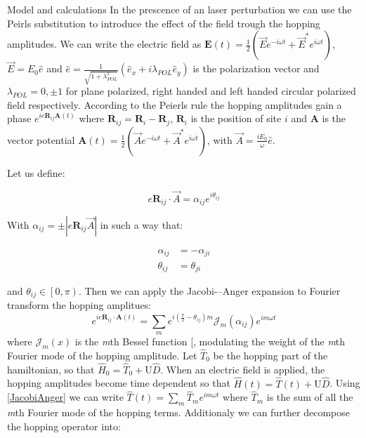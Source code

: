 \documentclass[aps,prl,twocolumn,amsmath,amssymb,superscriptaddress,nobibnotes]{revtex4}%
\renewcommand{\cite}[1]{{[}\onlinecite{#1}{]}}
\newcommand{\bs}{\boldsymbol}
\begin{document}
\begin{section}{Model and calculations}
In the prescence of an laser perturbation we can use the Peirls substitution to introduce the effect of the field trough the hopping amplitudes. We can write the electric field as $\bs{E}(t) = \frac{1}{2}(\vec{E}e^{-i\omega t}+\vec{E}^*e^{i\omega t})$, $\vec{E} = E_0\hat{e}$ and $\hat{e} = \frac{1}{\sqrt{1+\lambda_{POL}^2}}(\hat{e}_x+i\lambda_{POL}\hat{e}_y)$ is the polarization vector and $\lambda_{POL} = 0, \pm 1$ for plane polarized, right handed and left handed circular polarized field respectively. According to the Peierls rule the hopping amplitudes gain a phase $e^{ie\bs{R}_{ij}\bs{A}(t)}$ where $\bs{R}_{ij} = \bs{R}_i-\bs{R}_j$, $\bs{R}_i$ is the position of site $i$ and $\bs{A}$ is the vector potential $\bs{A}(t) = \frac{1}{2}(\vec{A}e^{-i\omega t} + \vec{A}^* e^{i\omega t})$, with $\vec{A} = \frac{iE_0}{\omega}\hat{e}$.

Let us define:

\begin{equation}
\label{Def_alpha}
e\bs{R}_{ij}\cdot\vec{A} = \alpha_{ij} e^{i \theta_{ij}}
\end{equation}

With $\alpha_{ij} = \pm|e\bs{R}_{ij}\vec{A}|$ in such a way that:

\begin{align}
\alpha_{ij} &= -\alpha_{ji} \label{alphaSym} \\
\theta_{ij} &= \theta_{ji} \label{thetaSym}
\end{align}

and $\theta_{ij} \in \left[0,\pi\right)$. Then we can apply the Jacobi-–Anger expansion to Fourier transform the hopping amplitues:
\begin{equation}
\label{JacobiAnger}
e^{ie\bs{R}_{ij}\cdot\bs{A}(t)} = \sum_m e^{i(\frac{\pi}{2}-\theta_{ij})m} \mathcal{J}_m(\alpha_{ij}) e^{im\omega t} 
\end{equation}
where $\mathcal{J}_m(x)$ is the \textit{m}th Bessel function \cite{Kitamura2017}, modulating the weight of the \textit{m}th Fourier mode of the hopping amplitude. Let $\hat{T}_0$ be the hopping part of the hamiltonian, so that $\hat{H}_0 = \hat{T}_0 + \text{U}\hat{D}$. When an electric field is applied, the hopping amplitudes become time dependent so that $\hat{H}(t) = \hat{T}(t) +  \text{U}\hat{D}$. Using \ref{JacobiAnger} we can write $\hat{T}(t) = \sum_m \hat{T}_m e^{im \omega t}$ where $\hat{T}_m$ is the sum of all the \textit{m}th Fourier mode of the hopping terms. Additionaly we can further decompose the hopping operator into:


\end{section}
\end{document}
